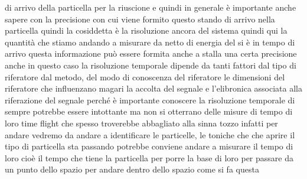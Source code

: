 di arrivo della particella per la riuscione e quindi in generale è importante anche sapere con la precisione con cui viene formito questo stando di arrivo nella particella quindi la cosiddetta è la risoluzione ancora del sistema quindi qui la quantità che stiamo andando a misurare da netto di energia del si è in tempo di arrivo questa informazione può essere formita anche a stalla una certa precisione anche in questo caso la risoluzione temporale dipende da tanti fattori dal tipo di riferatore dal metodo, del modo di conoscenza del riferatore le dimensioni del riferatore che influenzano magari la accolta del segnale e l'elibronica associata alla riferazione del segnale perché è importante conoscere la risoluzione temporale di sempre potrebbe essere intottante ma non si otterrano delle misure di tempo di loro time flight che spesso troverebbe abbagliato alla sinna tozzo infatti per andare vedremo da andare a identificare le particelle, le toniche che che aprire il tipo di particella sta passando potrebbe conviene andare a misurare il tempo di loro cioè il tempo che tiene la particella per porre la base di loro per passare da un punto dello spazio per andare dentro dello spazio come si fa questa 

